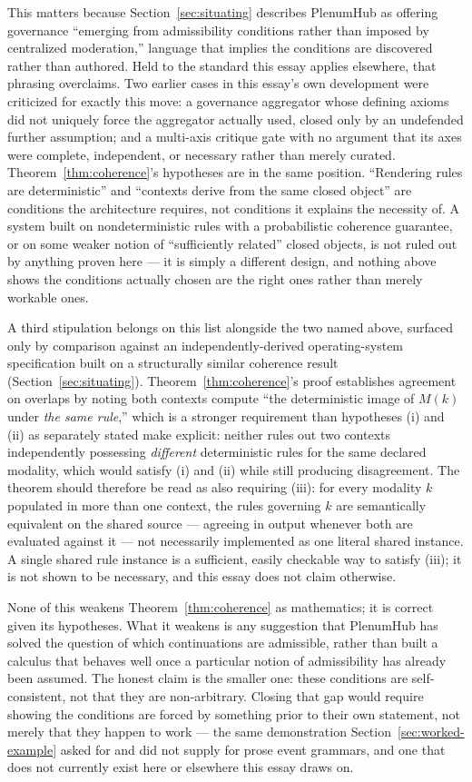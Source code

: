 \documentclass[11pt]{article}
\theoremstyle{definition}
\begin{document}
This matters because Section~\ref{sec:situating} describes PlenumHub as offering governance ``emerging from admissibility conditions rather than imposed by centralized moderation,'' language that implies the conditions are discovered rather than authored. Held to the standard this essay applies elsewhere, that phrasing overclaims. Two earlier cases in this essay's own development were criticized for exactly this move: a governance aggregator whose defining axioms did not uniquely force the aggregator actually used, closed only by an undefended further assumption; and a multi-axis critique gate with no argument that its axes were complete, independent, or necessary rather than merely curated. Theorem~\ref{thm:coherence}'s hypotheses are in the same position. ``Rendering rules are deterministic'' and ``contexts derive from the same closed object'' are conditions the architecture requires, not conditions it explains the necessity of. A system built on nondeterministic rules with a probabilistic coherence guarantee, or on some weaker notion of ``sufficiently related'' closed objects, is not ruled out by anything proven here --- it is simply a different design, and nothing above shows the conditions actually chosen are the right ones rather than merely workable ones.

A third stipulation belongs on this list alongside the two named above, surfaced only by comparison against an independently-derived operating-system specification built on a structurally similar coherence result (Section~\ref{sec:situating}). Theorem~\ref{thm:coherence}'s proof establishes agreement on overlaps by noting both contexts compute ``the deterministic image of $M(k)$ under \emph{the same rule},'' which is a stronger requirement than hypotheses (i) and (ii) as separately stated make explicit: neither rules out two contexts independently possessing \emph{different} deterministic rules for the same declared modality, which would satisfy (i) and (ii) while still producing disagreement. The theorem should therefore be read as also requiring (iii): for every modality $k$ populated in more than one context, the rules governing $k$ are semantically equivalent on the shared source --- agreeing in output whenever both are evaluated against it --- not necessarily implemented as one literal shared instance. A single shared rule instance is a sufficient, easily checkable way to satisfy (iii); it is not shown to be necessary, and this essay does not claim otherwise.

None of this weakens Theorem~\ref{thm:coherence} as mathematics; it is correct given its hypotheses. What it weakens is any suggestion that PlenumHub has solved the question of which continuations are admissible, rather than built a calculus that behaves well once a particular notion of admissibility has already been assumed. The honest claim is the smaller one: these conditions are self-consistent, not that they are non-arbitrary. Closing that gap would require showing the conditions are forced by something prior to their own statement, not merely that they happen to work --- the same demonstration Section~\ref{sec:worked-example} asked for and did not supply for prose event grammars, and one that does not currently exist here or elsewhere this essay draws on.
\end{document}
